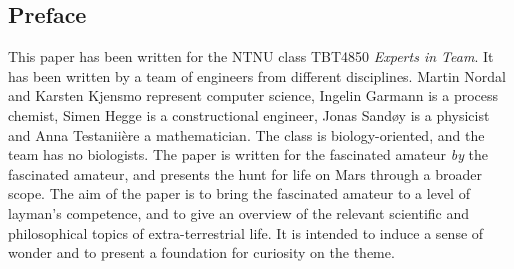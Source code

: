 \subsection*{Preface}

This paper has been written for the NTNU class TBT4850 \emph{Experts in Team}. It has been written by a team of engineers from different disciplines. Martin Nordal and Karsten Kjensmo represent computer science, Ingelin Garmann is a process chemist, Simen Hegge is a constructional engineer, Jonas Sandøy is a physicist and Anna Testanii\`{e}re a mathematician. The class is biology-oriented, and the team has no biologists. The paper is written for the fascinated amateur \emph{by} the fascinated amateur, and presents the hunt for life on Mars through a broader scope. The aim of the paper is to bring the fascinated amateur to a level of layman's competence, and to give an overview of the relevant scientific and philosophical topics of extra-terrestrial life. It is intended to induce a sense of wonder and to present a foundation for curiosity on the theme.
